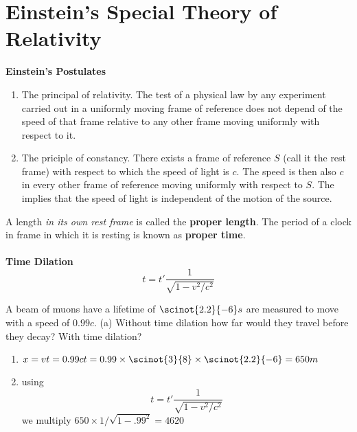 \section{Einstein's Special Theory of Relativity}
\textbf{Einstein's Postulates}
\begin{enumerate}
	\item The principal of relativity. The test of a physical law by any experiment carried out in a uniformly moving frame of reference does not depend of the speed of that frame relative to any other frame moving uniformly with respect to it. 
	\item The priciple of constancy. There exists a frame of reference $ S $ (call it the rest frame) with respect to which the speed of light is $ c $. The speed is then also $ c $ in every other frame of reference moving uniformly with respect to $ S $. The implies that the speed of light is independent of the motion of the source. 
\end{enumerate} 
A length \textit{in its own rest frame} is called the \textbf{proper length}. The period of a clock in frame in which it is resting is known as \textbf{proper time}. \\ \\
\textbf{Time Dilation}
\[ t = t' \dfrac{1}{\sqrt{1 - v^2 / c^2}}  \]
\begin{example}
	A beam of muons have a lifetime of $ \scinot{2.2}{-6} s$ are measured to move with a speed of $ 0.99 c $. (a) Without time dilation how far would they travel before they decay? With time dilation?
	
	\begin{enumerate}
		\item  $ x = vt = 0.99ct= 0.99 \times \scinot{3	}{8} \times \scinot{2.2}{-6} = 650m $
		\item  using \[ t = t' \dfrac{1}{\sqrt{1-v^2/c^2}} \] we multiply $ 650 \times 1/\sqrt{1-.99^2} = 4620 $ 
	\end{enumerate}
\end{example}
